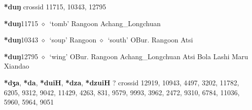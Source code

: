 \item
\textbf{*duŋ}
  {\tiny crossid 11715, 10343, 12795}
  \begin{list}{}{\leftmargin=1.5em \itemindent=-1.5em}
  \item {\footnotesize \textbf{*duŋ}}{\tiny 11715}
         $\diamond$~`tomb'
         Rangoon 
\hspace{1ex}
         Achang\_Longchuan 
  \item {\footnotesize \textbf{*duŋ}}{\tiny 10343}
\hspace{1ex}
         $\diamond$~`soup'
         Rangoon 
\hspace{1ex}
         $\diamond$~`south'
         OBur. 
\hspace{1ex}
         Rangoon 
\hspace{1ex}
         Atsi 
  \item {\footnotesize \textbf{*duŋ}}{\tiny 12795}
\hspace{1ex}
         $\diamond$~`wing'
         OBur. 
\hspace{1ex}
         Rangoon 
\hspace{1ex}
         Achang\_Longchuan 
\hspace{1ex}
         Atsi 
\hspace{1ex}
         Bola 
\hspace{1ex}
         Lashi 
\hspace{1ex}
         Maru 
\hspace{1ex}
         Xiandao 
  \end{list}
\item
\textbf{*dʒa}, \textbf{*da}, \textbf{*duiH}, \textbf{*dza}, \textbf{*dzuiH}
?
  {\tiny crossid 12919, 10943, 4497, 3202, 11782, 6205, 9312, 9042, 11429, 4263, 831, 9579, 9993, 3962, 2472, 9310, 6784, 11036, 5960, 5964, 9051}
